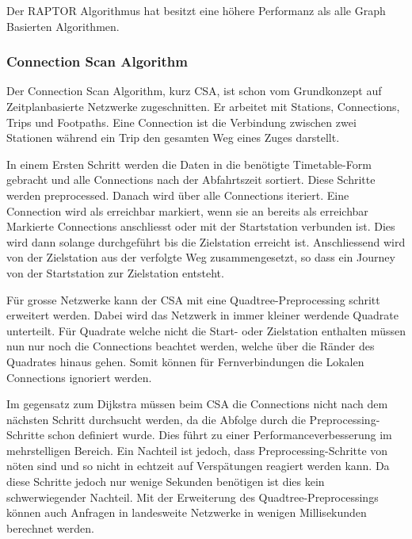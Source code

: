 Der RAPTOR Algorithmus hat besitzt eine höhere Performanz als alle Graph Basierten Algorithmen.

\subsubsection{Connection Scan Algorithm}
\label{subsubsec:Connection Scan Algorithm}
Der Connection Scan Algorithm, kurz CSA, ist schon vom Grundkonzept auf Zeitplanbasierte Netzwerke zugeschnitten. Er arbeitet mit Stations, Connections, Trips und Footpaths. Eine Connection ist die Verbindung zwischen zwei Stationen während ein Trip den gesamten Weg eines Zuges darstellt. \vspace{0.5cm}

In einem Ersten Schritt werden die Daten in die benötigte Timetable-Form gebracht und alle Connections nach der Abfahrtszeit sortiert. Diese Schritte werden preprocessed. Danach wird über alle Connections iteriert. Eine Connection wird als erreichbar markiert, wenn sie an bereits als erreichbar Markierte Connections anschliesst oder mit der Startstation verbunden ist. Dies wird dann solange durchgeführt bis die Zielstation erreicht ist. Anschliessend wird von der Zielstation aus der verfolgte Weg zusammengesetzt, so dass ein Journey von der Startstation zur Zielstation entsteht. \vspace{0.5cm}

Für grosse Netzwerke kann der CSA mit eine Quadtree-Preprocessing schritt erweitert werden. Dabei wird das Netzwerk in immer kleiner werdende Quadrate unterteilt. Für Quadrate welche nicht die Start- oder Zielstation enthalten müssen nun nur noch die Connections beachtet werden, welche über die Ränder des Quadrates hinaus gehen. Somit können für Fernverbindungen die Lokalen Connections ignoriert werden. \vspace{0.5cm}

Im gegensatz zum Dijkstra müssen beim CSA die Connections nicht nach dem nächsten Schritt durchsucht werden, da die Abfolge durch die Preprocessing-Schritte schon definiert wurde. Dies führt zu einer Performanceverbesserung im mehrstelligen Bereich. Ein Nachteil ist jedoch, dass Preprocessing-Schritte von nöten sind und so nicht in echtzeit auf Verspätungen reagiert werden kann. Da diese Schritte jedoch nur wenige Sekunden benötigen ist dies kein schwerwiegender Nachteil. Mit der Erweiterung des Quadtree-Preprocessings können auch Anfragen in landesweite Netzwerke in wenigen Millisekunden berechnet werden. 

